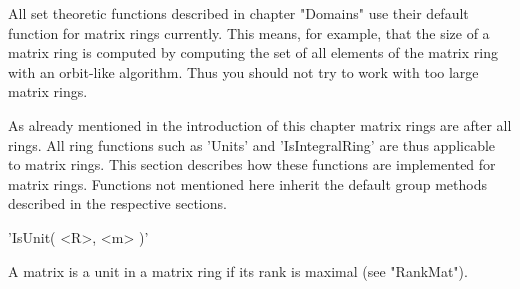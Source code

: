 
All set  theoretic functions described in  chapter  "Domains"  use  their
default function for matrix rings  currently.   This  means, for example,
that the size of a  matrix ring is  computed by computing the set of  all
elements  of the  matrix  ring  with an  orbit-like  algorithm.  Thus you
should not try to work with too large matrix rings.


As already mentioned in the introduction of this chapter matrix rings are
after all rings.  All ring functions such as 'Units' and 'IsIntegralRing'
are thus applicable  to matrix rings.  This  section  describes how these
functions are implemented for matrix rings.  Functions not mentioned here
inherit the default group methods described in the respective sections.

\vspace{5mm}
'IsUnit( <R>, <m> )'

A  matrix  is a  unit in  a  matrix  ring  if its  rank  is maximal  (see
"RankMat").





